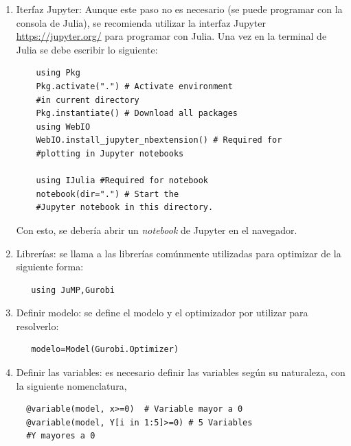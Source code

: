 \begin{enumerate}
    \item Iterfaz Jupyter: Aunque este paso no es necesario (se puede programar con la consola de Julia), se recomienda utilizar la interfaz Jupyter \url{https://jupyter.org/} para programar con Julia. Una vez en la terminal de Julia se debe escribir lo siguiente:
    
    \begin{footnotesize}
    \begin{lstlisting}
    using Pkg
    Pkg.activate(".") # Activate environment 
    #in current directory
    Pkg.instantiate() # Download all packages
    using WebIO
    WebIO.install_jupyter_nbextension() # Required for 
    #plotting in Jupyter notebooks

    using IJulia #Required for notebook
    notebook(dir=".") # Start the 
    #Jupyter notebook in this directory.
    \end{lstlisting}
    \end{footnotesize}
    
    Con esto, se debería abrir un \textit{notebook} de Jupyter en el navegador.
    
   \item Librerías: se llama a las librerías comúnmente utilizadas para optimizar de la siguiente forma:
   
   \begin{footnotesize}
   \begin{lstlisting}
   using JuMP,Gurobi
   \end{lstlisting}
   \end{footnotesize}
   
   \item Definir modelo: se define el modelo y el optimizador por utilizar para resolverlo:
   
   \begin{footnotesize}
   \begin{lstlisting}
   modelo=Model(Gurobi.Optimizer)
   \end{lstlisting}
   \end{footnotesize}
   
   \item Definir las variables: es necesario definir las variables según su naturaleza, con la siguiente nomenclatura,
   
   \begin{footnotesize}
   \begin{lstlisting}
  @variable(model, x>=0)  # Variable mayor a 0
  @variable(model, Y[i in 1:5]>=0) # 5 Variables 
  #Y mayores a 0
   \end{lstlisting}
   \end{footnotesize}
   

\end{enumerate}
